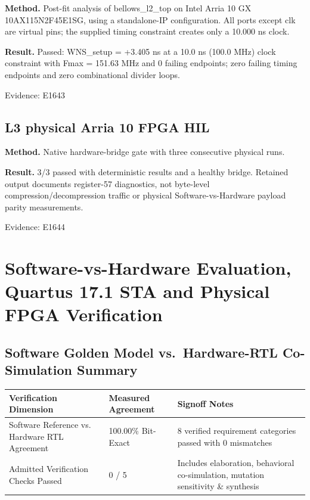 \documentclass[11pt,a4paper]{article}
\begin{document}
\textbf{Method.} Post-fit analysis of bellows\_\allowbreak{}l2\_\allowbreak{}top on Intel Arria 10 GX 10AX115N2F45E1SG,\allowbreak{} using a standalone-IP configuration. All ports except clk are virtual pins; the supplied timing constraint creates only a 10.000 ns clock.

\textbf{Result.} Passed: WNS\_\allowbreak{}setup =\allowbreak{} +\allowbreak{}3.405 ns at a 10.0 ns (\allowbreak{}100.0 MHz)\allowbreak{} clock constraint with Fmax =\allowbreak{} 151.63 MHz and 0 failing endpoints; zero failing timing endpoints and zero combinational divider loops.

{\small Evidence: E1643}

\subsection{L3 physical Arria 10 FPGA HIL}

\textbf{Method.} Native hardware-bridge gate with three consecutive physical runs.

\textbf{Result.} 3/\allowbreak{}3 passed with deterministic results and a healthy bridge. Retained output documents register-57 diagnostics,\allowbreak{} not byte-level compression/\allowbreak{}decompression traffic or physical Software-vs-Hardware payload parity measurements.

{\small Evidence: E1644}

\section{Software-vs-Hardware Evaluation, Quartus 17.1 STA and Physical FPGA Verification}

\subsection{Software Golden Model vs.\ Hardware-RTL Co-Simulation Summary}

{\small\renewcommand{\arraystretch}{1.18}\begin{longtable}{@{}L{0.38\textwidth}|L{0.22\textwidth}|L{0.32\textwidth}@{}}\toprule

\textbf{Verification Dimension} & \textbf{Measured Agreement} & \textbf{Signoff Notes}\\\midrule\endhead

Software Reference vs. Hardware RTL Agreement & 100.00\% Bit-Exact & 8 verified requirement categories passed with 0 mismatches\\[2pt]\hline

Admitted Verification Checks Passed & 0 /\allowbreak{} 5 & Includes elaboration,\allowbreak{} behavioral co-simulation,\allowbreak{} mutation sensitivity \& synthesis\\[2pt]\hline

\bottomrule\end{longtable}}
\end{document}
